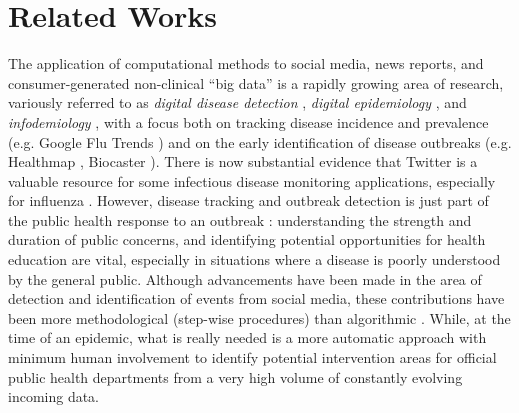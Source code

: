 \section{Related Works}
\label{sec:related}
The application of computational methods to social media, news
reports, and 
consumer-generated non-clinical ``big data'' is a rapidly growing area
of research, variously referred to as \emph{digital disease detection}
\cite{Brownstein:2009aa},
\emph{digital epidemiology} \cite{Salathe:2012aa}, and \emph{infodemiology} \cite{Eysenbach:2009aa}, with a focus
both on tracking disease incidence and prevalence (e.g. Google Flu
Trends \cite{Cook:2011aa})
and on the early identification of disease outbreaks (e.g. Healthmap \cite{Freifeld:2008aa},
Biocaster \cite{Collier:2008aa}).   There is now substantial evidence
that Twitter is a valuable resource for some infectious disease
monitoring applications, especially for influenza
\cite{Signorini:2011aa,Collier:2011aa}.
However, 
disease tracking and outbreak detection is just part of the public
health response to an outbreak \cite{Oyeyemi:2014aa}: understanding the strength and duration of public concerns, 
and identifying potential opportunities for health education are
vital, especially in situations where a disease is poorly
understood \cite{SteelFisher:2015aa} by the general public.  
Although advancements have been made in the area of detection and
identification of events from social media, these contributions
have been more methodological (step-wise procedures) than algorithmic \cite{weng2011event, li2012tedas, becker2011beyond, cataldi2010emerging}.  
While, at the time of an epidemic, what is really needed is a more automatic approach with minimum
human involvement to identify potential
intervention areas for official public health departments from a very high volume
of constantly evolving incoming data.
